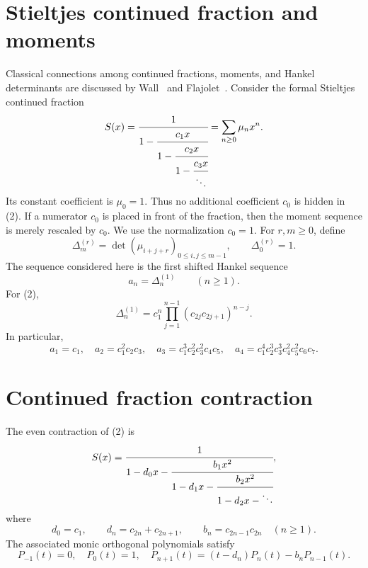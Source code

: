 \documentclass[11pt]{article}
\theoremstyle{remark}
\begin{document}
\section{Stieltjes continued fraction and moments}
Classical connections among continued fractions, moments, and Hankel determinants are discussed by Wall~\cite{Wall} and Flajolet~\cite{Flajolet1980}. Consider the formal Stieltjes continued fraction
\begin{equation}
S(x)=\cfrac{1}{1-\cfrac{c_1x}{1-\cfrac{c_2x}{1-\cfrac{c_3x}{\ddots}}}}
=\sum_{n\ge0}\mu_nx^n.
\end{equation}
Its constant coefficient is $\mu_0=1$. Thus no additional coefficient $c_0$ is hidden in (2). If a numerator $c_0$ is placed in front of the fraction, then the moment sequence is merely rescaled by $c_0$. We use the normalization $c_0=1$.
For $r,m\ge0$, define
\begin{equation}
\Delta_m^{(r)}=\det(\mu_{i+j+r})_{0\le i,j\le m-1},\qquad \Delta_0^{(r)}=1.
\end{equation}
The sequence considered here is the first shifted Hankel sequence
\begin{equation}
a_n=\Delta_n^{(1)}\qquad(n\ge1).
\end{equation}
For (2),
\begin{equation}
\Delta_n^{(1)}=c_1^n\prod_{j=1}^{n-1}(c_{2j}c_{2j+1})^{n-j}.
\end{equation}
In particular,
\begin{equation}
a_1=c_1,\quad a_2=c_1^2c_2c_3,\quad
a_3=c_1^3c_2^2c_3^2c_4c_5,\quad
a_4=c_1^4c_2^3c_3^3c_4^2c_5^2c_6c_7.
\end{equation}

\section{Continued fraction contraction}
The even contraction of (2) is
\begin{equation}
S(x)=\cfrac{1}{1-d_0x-\cfrac{b_1x^2}{1-d_1x-\cfrac{b_2x^2}{1-d_2x-\ddots}}},
\end{equation}
where
\begin{equation}
d_0=c_1,\qquad d_n=c_{2n}+c_{2n+1},\qquad b_n=c_{2n-1}c_{2n}\quad(n\ge1).
\end{equation}
The associated monic orthogonal polynomials satisfy
\begin{equation}
P_{-1}(t)=0,\quad P_0(t)=1,\quad
P_{n+1}(t)=(t-d_n)P_n(t)-b_nP_{n-1}(t).
\end{equation}
\end{document}
